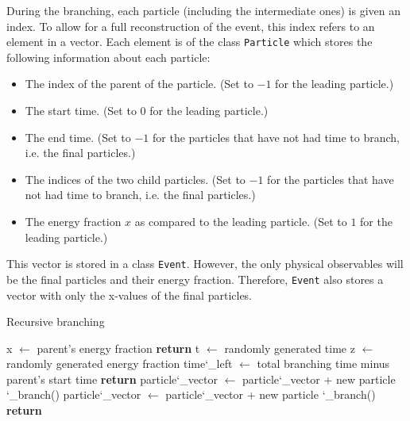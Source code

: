 \documentclass[a4paper,12pt]{article}
\numberwithin{equation}{section}
\begin{document}


During the branching, each particle (including the intermediate ones) is given an index. To allow for a full reconstruction of the event, this index refers to an element in a vector. Each element is of the class {\tt Particle} which stores the following information about each particle:
\begin{itemize}
\item The index of the parent of the particle. (Set to $-1$ for the leading particle.)
\item The start time. (Set to $0$ for the leading particle.)
\item The end time. (Set to $-1$ for the particles that have not had time to branch, i.e. the final particles.)
\item The indices of the two child particles. (Set to $-1$ for the particles that have not had time to branch, i.e. the final particles.)
\item The energy fraction $x$ as compared to the leading particle. (Set to $1$ for the leading particle.)
\end{itemize}
This vector is stored in a class {\tt Event}. However, the only physical observables will be the final particles and their energy fraction. Therefore, {\tt Event} also stores a vector with only the x-values of the final particles. 


\begin{algorithm}
\caption{Recursive branching}\label{branchingAlg}
\begin{tt}
\begin{algorithmic}[0]
\State x $\gets$ parent's energy fraction
 
\State \textbf{return}
\EndIf
\State t $\gets$ randomly generated time
\State z $\gets$ randomly generated energy fraction
\State time\char`_left $\gets$ total branching time minus parent's start time
 
\State \textbf{return}
\EndIf
\State particle\char`_vector $\gets$ particle\char`_vector + new particle
\State \char`_branch()
\State particle\char`_vector $\gets$ particle\char`_vector + new particle
\State \char`_branch()
\State \textbf{return}
\EndFunction
\end{algorithmic}
\end{tt}
\end{algorithm}
\end{document}
